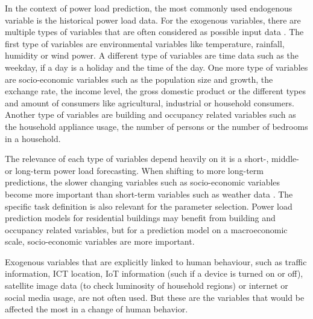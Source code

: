 In the context of power load prediction, the most commonly 
used endogenous variable is the historical power load data.
For the exogenous variables, there are multiple types of 
variables that are often considered as possible input data \cite{exogenousdata}
\cite{exogenousdata2}.
The first type of variables are environmental variables like temperature, 
rainfall, humidity or wind power. A different type of variables are time data
such as the weekday, if a day is a holiday and the time of the day.
One more type of variables are socio-economic variables such as the
population size and growth, the exchange rate, the income level,
the gross domestic product or the different types and amount 
of consumers like agricultural, industrial or household consumers.
Another type of variables are building and occupancy related variables such
as the household appliance usage,
the number of persons or the number of bedrooms in a household.

The relevance of each type of variables depend heavily on it is
a short-, middle- or long-term power load forecasting. When shifting to more 
long-term predictions, the slower changing variables such as socio-economic
variables become more important than short-term variables such as weather data 
\cite{loadforecastingtimedependency2}\cite{loadforecastingtimedependency}.
The specific task definition is also relevant for the parameter selection.
Power load prediction models for residential buildings may benefit from 
building and occupancy related variables, but for a prediction model on a 
macroeconomic scale, socio-economic variables are more important.

Exogenous variables that are explicitly linked to human behaviour, 
such as traffic information, ICT location, IoT information (such if
a device is turned on or off), satellite image data (to check luminosity
of household regions) or 
internet or social media usage, are not often used. 
But these are the variables that would be affected the most in a change of 
human behavior.

